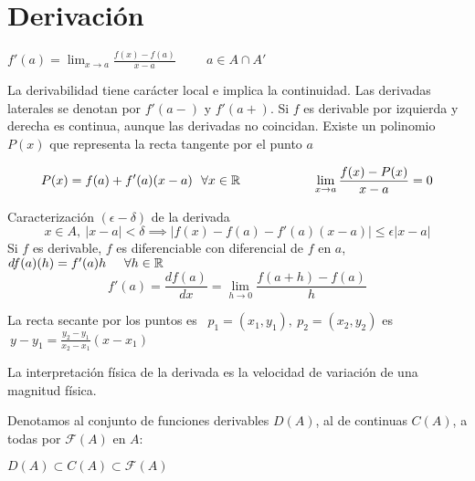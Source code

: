 \section{Derivación}
\begin{center}
$ f'(a) = \lim_{x\rightarrow a} \frac{f(x)-f(a)}{x-a} \hspace{1cm} a\in A\cap A' $
\end{center}

La derivabilidad tiene carácter local e implica la continuidad. 
Las derivadas laterales se denotan por $f'(a-)$ y $f'(a+)$.
Si $f$ es derivable por izquierda y derecha es continua, aunque las derivadas no coincidan. Existe un polinomio $P(x)$ que representa la recta tangente por el punto $a$

$$ P(x) = f(a) + f'(a)(x-a) \ \ \forall x\in\mathbb{R} \hspace{2cm}
\lim_{x\rightarrow a} \frac{f(x)-P(x)}{x-a} = 0$$

Caracterización $(\epsilon-\delta)$ de la derivada
$$ x\in A, \ |x-a|<\delta \implies |f(x)-f(a)-f'(a)(x-a)|\leq \epsilon |x-a| $$
Si $f$ es derivable, $f$ es diferenciable con diferencial de $f$ en $a$,
$ df(a)(h) = f'(a)h \hspace{0.5cm} \forall h\in\mathbb{R} $
$$ f'(a) = \frac{df(a)}{dx} = \lim_{h\rightarrow 0}\frac{f(a+h)-f(a)}{h} $$

La recta secante por los puntos es \  $p_1 = (x_1, y_1), \ p_2 = (x_2, y_2)$ es $\ y-y_1 = \frac{y_2-y_1}{x_2-x_1}(x-x_1)$

La interpretación física de la derivada es la velocidad de variación de una magnitud física.

Denotamos al conjunto de funciones derivables $D(A)$, al de continuas $C(A)$, a todas por $\mathscr{F}(A)$ en $A$:
\begin{center}
$ D(A) \subset C(A) \subset \mathscr{F}(A) $
\end{center}
